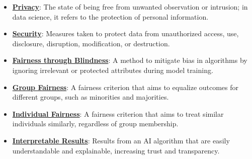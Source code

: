 \documentclass{article}%
\begin{document}
\begin{itemize}[leftmargin=*]
\item \href{https://purdue.brightspace.com/d2l/common/assets/pdfjs-d2l-dist/1.0.14-legacy/web/viewer.html?file=%2Fcontent%2Fenforced%2F1095467-wl.202510.CS.24300.001%2F16L2-ethics.pdf%3Fou%3D1095467&lang=en-us&container=d2l-fileviewer-rendered-pdf&fullscreen=d2l-fileviewer-rendered-pdf-dialog&height=667#page=11}{\textbf{Privacy}}: The state of being free from unwanted observation or intrusion; in data science, it refers to the protection of personal information.%
\item \href{https://purdue.brightspace.com/d2l/common/assets/pdfjs-d2l-dist/1.0.14-legacy/web/viewer.html?file=%2Fcontent%2Fenforced%2F1095467-wl.202510.CS.24300.001%2F16L2-ethics.pdf%3Fou%3D1095467&lang=en-us&container=d2l-fileviewer-rendered-pdf&fullscreen=d2l-fileviewer-rendered-pdf-dialog&height=667#page=11}{\textbf{Security}}: Measures taken to protect data from unauthorized access, use, disclosure, disruption, modification, or destruction.%
\item \href{https://purdue.brightspace.com/d2l/common/assets/pdfjs-d2l-dist/1.0.14-legacy/web/viewer.html?file=%2Fcontent%2Fenforced%2F1095467-wl.202510.CS.24300.001%2F16L2-ethics.pdf%3Fou%3D1095467&lang=en-us&container=d2l-fileviewer-rendered-pdf&fullscreen=d2l-fileviewer-rendered-pdf-dialog&height=667#page=25}{\textbf{Fairness through Blindness}}: A method to mitigate bias in algorithms by ignoring irrelevant or protected attributes during model training.%
\item \href{https://purdue.brightspace.com/d2l/common/assets/pdfjs-d2l-dist/1.0.14-legacy/web/viewer.html?file=%2Fcontent%2Fenforced%2F1095467-wl.202510.CS.24300.001%2F16L2-ethics.pdf%3Fou%3D1095467&lang=en-us&container=d2l-fileviewer-rendered-pdf&fullscreen=d2l-fileviewer-rendered-pdf-dialog&height=667#page=26}{\textbf{Group Fairness}}: A fairness criterion that aims to equalize outcomes for different groups, such as minorities and majorities.%
\item \href{https://purdue.brightspace.com/d2l/common/assets/pdfjs-d2l-dist/1.0.14-legacy/web/viewer.html?file=%2Fcontent%2Fenforced%2F1095467-wl.202510.CS.24300.001%2F16L2-ethics.pdf%3Fou%3D1095467&lang=en-us&container=d2l-fileviewer-rendered-pdf&fullscreen=d2l-fileviewer-rendered-pdf-dialog&height=667#page=27}{\textbf{Individual Fairness}}: A fairness criterion that aims to treat similar individuals similarly, regardless of group membership.%
\item \href{https://purdue.brightspace.com/d2l/common/assets/pdfjs-d2l-dist/1.0.14-legacy/web/viewer.html?file=%2Fcontent%2Fenforced%2F1095467-wl.202510.CS.24300.001%2F16L2-ethics.pdf%3Fou%3D1095467&lang=en-us&container=d2l-fileviewer-rendered-pdf&fullscreen=d2l-fileviewer-rendered-pdf-dialog&height=667#page=28}{\textbf{Interpretable Results}}: Results from an AI algorithm that are easily understandable and explainable, increasing trust and transparency.%
\end{itemize}
\end{document}
